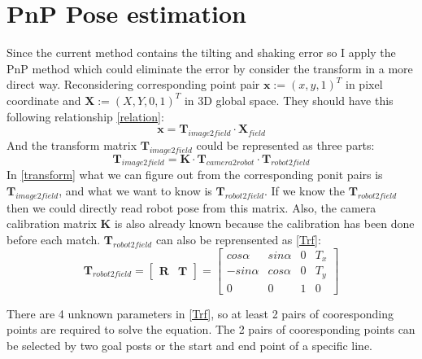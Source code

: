 \section{PnP Pose estimation}
Since the current method contains the tilting and shaking error so I apply the PnP method \cite{ETHPnP} which could eliminate the error by consider the transform in a more direct way. Reconsidering corresponding point pair $\mathbf{x}:=(x,y,1)^T$ in pixel coordinate and $\mathbf{X}:=(X,Y,0,1)^T$ in 3D global space. They should have this following relationship \eqref{relation}:
\begin{equation}
\mathbf{x} = \mathbf{T}_{image2field} \cdot \mathbf{X}_{field} \label{relation}
\end{equation}
And the transform matrix $\mathbf{T}_{image2field}$ could be represented as three parts: 
\begin{equation}
\mathbf{T}_{image2field}=\mathbf{K} \cdot \mathbf{T}_{camera2robot} \cdot \mathbf{T}_{robot2field} \label{transform}
\end{equation}
In \eqref{transform} what we can figure out from the corresponding ponit pairs is $\mathbf{T}_{image2field}$, and what we want to know is $\mathbf{T}_{robot2field}$. If we know the $\mathbf{T}_{robot2field}$ then we could directly read robot pose from this matrix. Also, the camera calibration matrix $\mathbf{K}$ is also already known because the calibration has been done before each match. 
$\mathbf{T}_{robot2field}$ can also be reprensented as \eqref{Trf}:
\begin{equation}\mathbf{T}_{robot2field}=
\begin{bmatrix}
\mathbf{R} & \mathbf{T}
\end{bmatrix}=
\begin{bmatrix}
cos\alpha & sin\alpha & 0 & T_x\\
-sin\alpha & cos\alpha & 0 & T_y\\
0 & 0 & 1 & 0
\end{bmatrix} \label{Trf}
\end{equation}

There are 4 unknown parameters in \eqref{Trf}, so at least 2 pairs of cooresponding points are required to solve the equation. The 2 pairs of cooresponding points can be selected by two goal posts or the start and end point of a specific line. 

